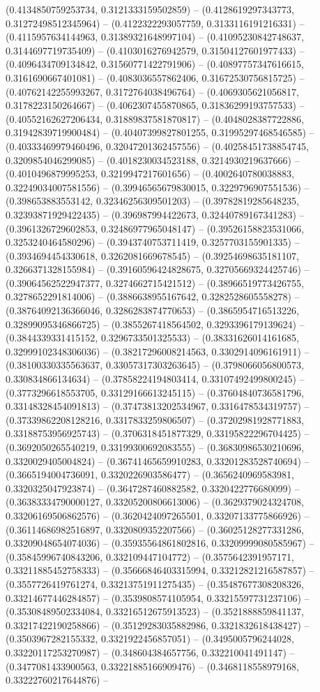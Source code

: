 (0.4134850759253734, 0.3121333159502859) -- (0.4128619297343773, 0.31272498512345964) -- (0.4122322293057759, 0.3133116191216331) -- (0.4115957634144963, 0.31389321648997104) -- (0.41095230842748637, 0.3144697719735409) -- (0.4103016276942579, 0.31504127601977433) -- (0.4096434709134842, 0.31560771422791906) -- (0.40897757347616615, 0.3161690667401081) -- (0.4083036557862406, 0.31672530756815725) -- (0.40762142255993267, 0.3172764038496764) -- (0.4069305621056817, 0.3178223150264667) -- (0.4062307455870865, 0.31836299193757533) -- (0.40552162627206434, 0.31889837581870817) -- (0.4048028387722886, 0.31942839719900484) -- (0.40407399827801255, 0.31995297468546585) -- (0.40333469979460496, 0.32047201362457556) -- (0.40258451738854745, 0.3209854046299085) -- (0.4018230034523188, 0.3214930219637666) -- (0.4010496879995253, 0.3219947217601656) -- (0.4002640780038883, 0.32249034007581556) -- (0.39946565679830015, 0.3229796907551536) -- (0.398653883553142, 0.32346256309501203) -- (0.39782819285648235, 0.32393871929422435) -- (0.396987994422673, 0.32440789167341283) -- (0.3961326729602853, 0.32486977965048147) -- (0.39526158823531066, 0.3253240464580296) -- (0.3943740753711419, 0.3257703155901335) -- (0.3934694454330618, 0.3262081669678545) -- (0.39254698635181107, 0.3266371328155984) -- (0.39160596424828675, 0.32705669324425746) -- (0.39064562522947377, 0.3274662715421512) -- (0.38966519773426755, 0.3278652291814006) -- (0.3886638955167642, 0.3282528605558278) -- (0.38764092136366046, 0.3286283874770653) -- (0.3865954716513226, 0.32899095346866725) -- (0.3855267418564502, 0.3293396179139624) -- (0.3844339331415152, 0.3296733501325533) -- (0.38331626014161685, 0.32999102348306036) -- (0.38217296008214563, 0.3302914096161911) -- (0.38100330335563637, 0.33057317303263645) -- (0.3798066056800573, 0.330834866134634) -- (0.37858224194803414, 0.33107492499800245) -- (0.3773296618553705, 0.33129166613245115) -- (0.37604840736581796, 0.33148328454091813) -- (0.37473813202534967, 0.3316478534319757) -- (0.37339862208128216, 0.3317833259806507) -- (0.37202981928771883, 0.33188753956925743) -- (0.3706318451877329, 0.33195822296704425) -- (0.3692050265540219, 0.33199300692083555) -- (0.36830986530210696, 0.3320029405004824) -- (0.36741465659910283, 0.33201283528740694) -- (0.3665194004736091, 0.3320226903586477) -- (0.3656240969583981, 0.3320325047923874) -- (0.3647287460882582, 0.3320422776680099) -- (0.36383334790000127, 0.33205200806613006) -- (0.3629379024324708, 0.33206169506862576) -- (0.3620424097265501, 0.33207133775866926) -- (0.36114686982516897, 0.3320809352207566) -- (0.36025128277331286, 0.33209048654074036) -- (0.35935564861802816, 0.33209999080585967) -- (0.35845996740843206, 0.332109447104772) -- (0.3575642391957171, 0.33211885452758333) -- (0.35666846403315994, 0.33212821216587857) -- (0.3557726419761274, 0.33213751911275435) -- (0.35487677308208326, 0.33214677446284857) -- (0.3539808574105954, 0.33215597731237106) -- (0.35308489502334084, 0.33216512675913523) -- (0.3521888859841137, 0.33217422190258866) -- (0.35129283035882986, 0.3321832618438427) -- (0.3503967282155332, 0.3321922456857051) -- (0.3495005796244028, 0.33220117253270987) -- (0.348604384657756, 0.332210041491147) -- (0.3477081433900563, 0.33221885166909476) -- (0.3468118558979168, 0.33222760217644876) -- 